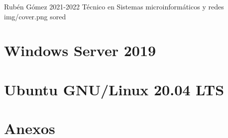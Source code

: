 \documentclass{../../../yukibook.cls/yukibook}
\begin{document}
  {Rubén Gómez}  %
  {2021-2022}    %
  {Técnico en Sistemas microinformáticos y redes} %
  {}	%
  {}	%
  {img/cover.png} %
  {sored} %

\part{Windows Server 2019}
\graphicspath{{img/windows/}}


\part{Ubuntu GNU/Linux 20.04 LTS}
\graphicspath{{img/linux/}}


\part{Anexos}

\graphicspath{{../../../anexos/instalar_ubuntu_lts/}}


\graphicspath{{../../../anexos/ubuntu_raid1/}}


\graphicspath{{../../../anexos/gestion_backups/}}


\graphicspath{{../../../anexos/sistemas_monitorizacion/}}


\graphicspath{{../../../anexos/monitorizacion_munin/}}


\graphicspath{{../../../anexos/}}

\end{document}
